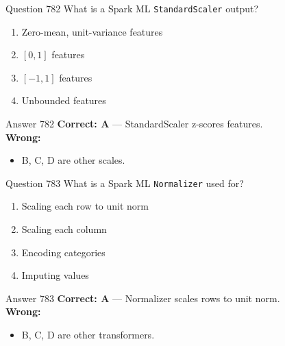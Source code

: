 \documentclass[aspectratio=169,11pt]{beamer}
\begin{document}
	\begin{frame}{Question 782}
		What is a Spark ML \texttt{StandardScaler} output?
		\begin{enumerate}[label=\Alph*.]
			\item Zero-mean, unit-variance features
			\item $[0,1]$ features
			\item $[-1,1]$ features
			\item Unbounded features
		\end{enumerate}
	\end{frame}
	\begin{frame}{Answer 782}
		\textbf{Correct: A} --- StandardScaler z-scores features.\\
		\vspace{0.5em}
		\textbf{Wrong:}
		\begin{itemize}
			\item B, C, D are other scales.
		\end{itemize}
	\end{frame}
	
	\begin{frame}{Question 783}
		What is a Spark ML \texttt{Normalizer} used for?
		\begin{enumerate}[label=\Alph*.]
			\item Scaling each row to unit norm
			\item Scaling each column
			\item Encoding categories
			\item Imputing values
		\end{enumerate}
	\end{frame}
	\begin{frame}{Answer 783}
		\textbf{Correct: A} --- Normalizer scales rows to unit norm.\\
		\vspace{0.5em}
		\textbf{Wrong:}
		\begin{itemize}
			\item B, C, D are other transformers.
		\end{itemize}
	\end{frame}
	
\end{document}
